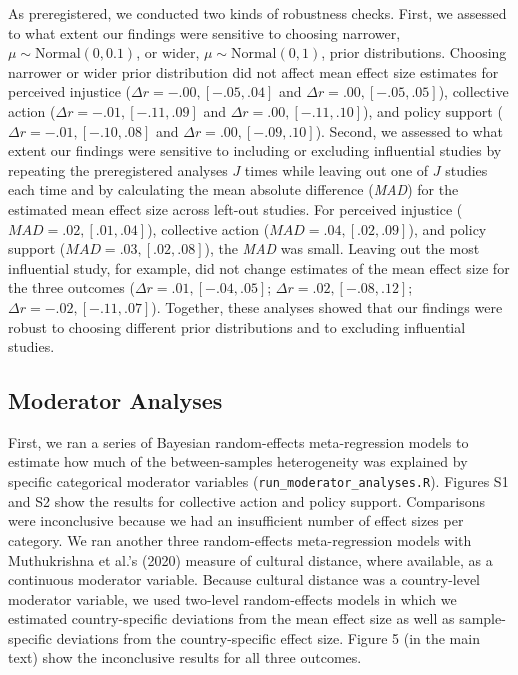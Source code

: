 \documentclass[12pt, letterpaper]{article}
\begin{document}
As preregistered, we conducted two kinds of robustness checks. First, we
assessed to what extent our findings were sensitive to choosing
narrower, \(\mu \sim \text{Normal}(0, 0.1)\), or wider,
\(\mu \sim \text{Normal}(0, 1)\), prior distributions. Choosing narrower
or wider prior distribution did not affect mean effect size estimates
for perceived injustice (\(\Delta r = -.00, [-.05, .04]\) and
\(\Delta r = .00, [-.05, .05]\)), collective action
(\(\Delta r = -.01, [-.11, .09]\) and \(\Delta r = .00, [-.11, .10]\)),
and policy support (\(\Delta r = -.01, [-.10, .08]\) and
\(\Delta r = .00, [-.09, .10]\)). Second, we assessed to what extent our
findings were sensitive to including or excluding influential studies by
repeating the preregistered analyses \(J\) times while leaving out one
of \(J\) studies each time and by calculating the mean absolute
difference (\emph{MAD}) for the estimated mean effect size across
left-out studies. For perceived injustice
(\(\textit{MAD} = .02, [.01, .04]\)), collective action
(\(\textit{MAD} = .04, [.02, .09]\)), and policy support
(\(\textit{MAD} = .03, [.02, .08]\)), the \emph{MAD} was small. Leaving
out the most influential study, for example, did not change estimates of
the mean effect size for the three outcomes
(\(\Delta r = .01, [-.04, .05]\); \(\Delta r = .02, [-.08, .12]\);
\(\Delta r = -.02, [-.11, .07]\)). Together, these analyses showed that
our findings were robust to choosing different prior distributions and
to excluding influential studies.

\hypertarget{moderator-analyses}{%
\subsection{Moderator Analyses}\label{moderator-analyses}}

First, we ran a series of Bayesian random-effects meta-regression models
to estimate how much of the between-samples heterogeneity was explained
by specific categorical moderator variables
(\texttt{run\_moderator\_analyses.R}). Figures S1 and S2 show the
results for collective action and policy support. Comparisons were
inconclusive because we had an insufficient number of effect sizes per
category. We ran another three random-effects meta-regression models
with Muthukrishna et al.'s (2020) measure of cultural distance, where
available, as a continuous moderator variable. Because cultural distance
was a country-level moderator variable, we used two-level random-effects
models in which we estimated country-specific deviations from the mean
effect size as well as sample-specific deviations from the
country-specific effect size. Figure 5 (in the main text) show the
inconclusive results for all three outcomes.
\end{document}
